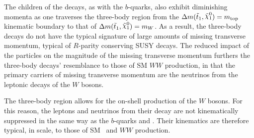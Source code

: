 The \ninoone children of the \stopone decays, as with the $b$-quarks, also exhibit diminishing
momenta as one traverses the three-body region from the $\sdiff = m_{\text{top}}$ kinematic boundary to that of $\sdiff = m_W$.
As a result, the three-body \stopone decays do not have the typical signature of large
amounts of missing transverse momentum, typical of $R$-parity conserving SUSY decays.
The reduced impact of the \ninoone particles on the magnitude of the missing transverse momentum
furthers the three-body \stopone decays' resemblance to those of SM $WW$ production, in that
the primary carriers of missing transverse momentum are the neutrinos from the leptonic decays
of the $W$ bosons.

The three-body region allows for the on-shell production of the $W$ bosons.
For this reason, the leptons and neutrinos from their decay are not kinematically suppressed
in the same way as the $b$-quarks and \ninoone.
Their kinematics are therefore typical, in scale, to those of SM \ttbar~and $WW$ production.
